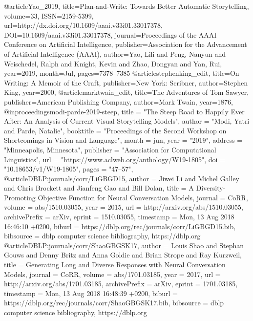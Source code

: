 @article{Yao_2019,
   title={Plan-and-Write: Towards Better Automatic Storytelling},
   volume={33},
   ISSN={2159-5399},
   url={http://dx.doi.org/10.1609/aaai.v33i01.33017378},
   DOI={10.1609/aaai.v33i01.33017378},
   journal={Proceedings of the AAAI Conference on Artificial Intelligence},
   publisher={Association for the Advancement of Artificial Intelligence (AAAI)},
   author={Yao, Lili and Peng, Nanyun and Weischedel, Ralph and Knight, Kevin and Zhao, Dongyan and Yan, Rui},
   year={2019},
   month={Jul},
   pages={7378–7385}
}
@article{stephenking_edit,
   title={On Writing: A Memoir of the Craft},
   publisher={New York: Scribner},
   author={Stephen King},
   year={2000},
}
@article{marktwain_edit,
   title={The Adventures of Tom Sawyer},
   publisher={American Publishing Company},
   author={Mark Twain},
   year={1876},
}
@inproceedings{modi-parde-2019-steep,
    title = "The Steep Road to Happily Ever After: An Analysis of Current Visual Storytelling Models",
    author = "Modi, Yatri  and
      Parde, Natalie",
    booktitle = "Proceedings of the Second Workshop on Shortcomings in Vision and Language",
    month = jun,
    year = "2019",
    address = "Minneapolis, Minnesota",
    publisher = "Association for Computational Linguistics",
    url = "https://www.aclweb.org/anthology/W19-1805",
    doi = "10.18653/v1/W19-1805",
    pages = "47--57",
}
@article{DBLP:journals/corr/LiGBGD15,
  author    = {Jiwei Li and
               Michel Galley and
               Chris Brockett and
               Jianfeng Gao and
               Bill Dolan},
  title     = {A Diversity-Promoting Objective Function for Neural Conversation Models},
  journal   = {CoRR},
  volume    = {abs/1510.03055},
  year      = {2015},
  url       = {http://arxiv.org/abs/1510.03055},
  archivePrefix = {arXiv},
  eprint    = {1510.03055},
  timestamp = {Mon, 13 Aug 2018 16:46:10 +0200},
  biburl    = {https://dblp.org/rec/journals/corr/LiGBGD15.bib},
  bibsource = {dblp computer science bibliography, https://dblp.org}
}
@article{DBLP:journals/corr/ShaoGBGSK17,
  author    = {Louis Shao and
               Stephan Gouws and
               Denny Britz and
               Anna Goldie and
               Brian Strope and
               Ray Kurzweil},
  title     = {Generating Long and Diverse Responses with Neural Conversation Models},
  journal   = {CoRR},
  volume    = {abs/1701.03185},
  year      = {2017},
  url       = {http://arxiv.org/abs/1701.03185},
  archivePrefix = {arXiv},
  eprint    = {1701.03185},
  timestamp = {Mon, 13 Aug 2018 16:48:39 +0200},
  biburl    = {https://dblp.org/rec/journals/corr/ShaoGBGSK17.bib},
  bibsource = {dblp computer science bibliography, https://dblp.org}
}
